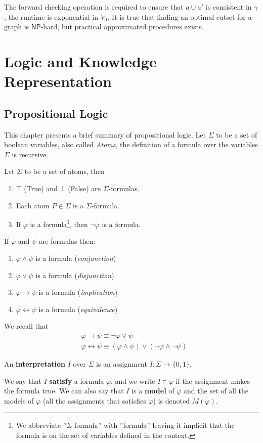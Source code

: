 \documentclass[10pt, letterpaper]{report}
\begin{document}
The forward checking operation is required to ensure that $a\cup a'$ is consistent in $\gamma$, the runtime is exponential in $V_0$. It is true that finding an optimal cutset for a graph is $\mathsf{NP}$-hard, but practical approximated procedures exists.



\chapter{Logic and Knowledge Representation}
\section{Propositional Logic}
This chapter presents a brief summary of propositional logic. Let $\Sigma$ to be a set of boolean variables, also called \textit{Atoms}, the definition of a formula over the variables $\Sigma$ is recursive.\begin{definition}
    Let $\Sigma$ to be a set of atoms, then\begin{enumerate}
        \item $\top$ (True) and  $\bot$ (False) are $\Sigma$-formulas.
        \item Each atom $P\in \Sigma$ is a $\Sigma$-formula. 
        \item If $\varphi$ is a formula\footnote{
            We abbreviate ''$\Sigma$-formula'' with ''formula'' leaving it implicit that the formula is on the set of variables defined in the context.
        }, then $\lnot \varphi$ is a formula.
    \end{enumerate}
\end{definition}
If $\varphi$ and $\psi$ are formulas then:\begin{enumerate}
    \item $\varphi\land \psi$ is a formula (\textit{conjunction})
    \item $\varphi\lor \psi$ is a formula (\textit{disjunction})
    \item $\varphi\rightarrow \psi$ is a formula (\textit{implication})
    \item $\varphi\leftrightarrow \psi$ is a formula (\textit{equivalence})
\end{enumerate}
We recall that \begin{align}
    &\varphi\rightarrow \psi\equiv \lnot \varphi \lor \psi \\ 
    &\varphi\leftrightarrow \psi \equiv (\varphi \land \psi)\lor(\lnot\varphi \land \lnot\psi)
\end{align}
\begin{definition}
    An \textbf{interpretation} $I$ over $\Sigma$ is an assignment $I:\Sigma\rightarrow \{0,1\}$.
\end{definition}
We say that $I$ \textbf{satisfy} a formula $\varphi$, and we write $I\models \varphi$ if the assignment makes the formula true. We can also say that $I$ is a \textbf{model} of $\varphi$ and the set of all the models of $\varphi$ (all the assignments that satisfies $\varphi$) is denoted $M(\varphi)$.
\end{document}

